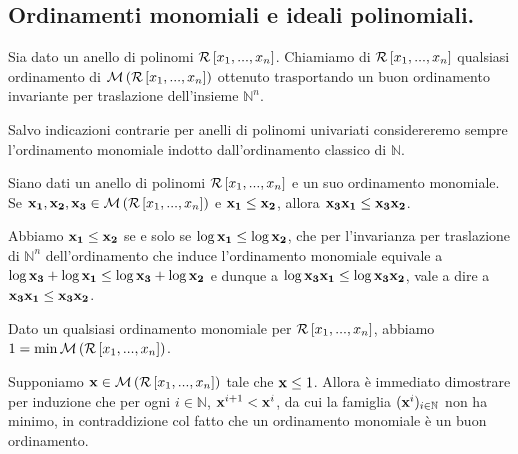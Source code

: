 \subsection{Ordinamenti monomiali e ideali polinomiali.}\label{OrdinamentiMonomialiEIdealiPolinomiali}
\begin{Definition}
	Sia dato un anello di polinomi $\mathcal{R} \left [ x_1, ..., x_n \right ]$. Chiamiamo  di $\mathcal{R} \left [ x_1, ..., x_n \right ]$ qualsiasi ordinamento di $\mathcal{M}\left ( \mathcal{R} \left [ x_1, ..., x_n \right ] \right )$ ottenuto trasportando un buon ordinamento invariante per traslazione dell'insieme $\mathbb{N}^n$.
\end{Definition}
\par Salvo indicazioni contrarie per anelli di polinomi univariati considereremo sempre l'ordinamento monomiale indotto dall'ordinamento classico di $\mathbb{N}$.
\begin{Theorem}\label{ordmonom_compatibilitaprodotto}
	Siano dati un anello di polinomi $\mathcal{R} \left [ x_1, ..., x_n \right ]$ e un suo ordinamento monomiale. Se $\mathbf{x_1}, \mathbf{x_2}, \mathbf{x_3} \in \mathcal{M}\left ( \mathcal{R} \left [ x_1, ..., x_n \right ] \right )$ e $\mathbf{x_1} \leq \mathbf{x_2}$, allora $\mathbf{x_3} \mathbf{x_1} \leq \mathbf{x_3} \mathbf{x_2}$.
\end{Theorem}
\Proof Abbiamo $\mathbf{x_1} \leq \mathbf{x_2}$ se e solo se $\log{\mathbf{x_1}} \leq \log{\mathbf{x_2}}$, che per l'invarianza per traslazione di $\mathbb{N}^n$ dell'ordinamento che induce l'ordinamento monomiale equivale a $\log{\mathbf{x_3}} + \log{\mathbf{x_1}} \leq \log{\mathbf{x_3}} + \log{\mathbf{x_2}}$ e dunque a $\log{\mathbf{x_3}\mathbf{x_1}} \leq \log{\mathbf{x_3}\mathbf{x_2}}$, vale a dire a $\mathbf{x_3}\mathbf{x_1} \leq \mathbf{x_3}\mathbf{x_2}$. \EndProof
\begin{Theorem}\label{ordmonom_min}
	Dato un qualsiasi ordinamento monomiale per $\mathcal{R} \left [ x_1, ..., x_n \right ]$, abbiamo $1 = \min \mathcal{M}\left ( \mathcal{R} \left [ x_1, ..., x_n \right ] \right )$.
\end{Theorem}
\Proof Supponiamo $\mathbf{x} \in \mathcal{M}\left ( \mathcal{R} \left [ x_1, ..., x_n \right ] \right )$ tale che $\mathbf{x} \leq 1$. Allora \`e immediato dimostrare per induzione che per ogni $i \in \mathbb{N}$, $\mathbf{x}^{i + 1} < \mathbf{x}^i$, da cui la famiglia $(\mathbf{x}^i)_{i \in \mathbb{N}}$  non ha minimo, in contraddizione col fatto che un ordinamento monomiale \`e un buon ordinamento. \EndProof
